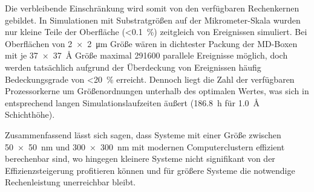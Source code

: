 Die verbleibende Einschränkung wird somit von den verfügbaren Rechenkernen gebildet.
In Simulationen mit Substratgrößen auf der Mikrometer-Skala wurden nur kleine Teile der Oberfläche (\SI{<0.1}{\percent}) zeitgleich von Ereignissen simuliert.
Bei Oberflächen von \SI{2x2}{\micro\meter} Größe wären in dichtester Packung der MD-Boxen mit je \SI{37x37}{\angstrom} Größe maximal \num{291600} parallele Ereignisse möglich, doch werden tatsächlich aufgrund der Überdeckung von Ereignissen häufig Bedeckungsgrade von \SI{<20}{\percent} erreicht.
Dennoch liegt die Zahl der verfügbaren Prozessorkerne um Größenordnungen unterhalb des optimalen Wertes, was sich in entsprechend langen Simulationslaufzeiten äußert (\SI{186.8}{\hour} für \SI{1.0}{\angstrom} Schichthöhe).

Zusammenfassend lässt sich sagen, dass Systeme mit einer Größe zwischen \SI{50x50}{\nano\meter} und \SI{300x300}{\nano\meter} mit modernen Computerclustern effizient berechenbar sind, wo hingegen kleinere Systeme nicht signifikant von der Effizienzsteigerung profitieren können und für größere Systeme die notwendige Rechenleistung unerreichbar bleibt.
